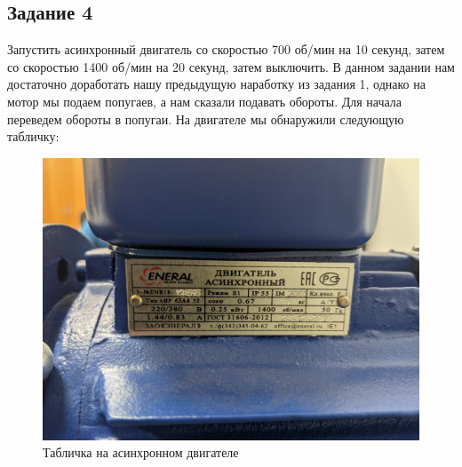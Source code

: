 \documentclass[a4paper, 16pt]{article}
\begin{document}
    \newpage
    \subsection{Задание 4}
    \noindent Запустить асинхронный двигатель со скоростью 700 об/мин на 10 секунд, затем со
    скоростью 1400 об/мин на 20 секунд, затем выключить. В данном задании нам достаточно доработать
    нашу предыдущую наработку из задания 1, однако на мотор мы подаем попугаев, а нам сказали подавать обороты. Для начала
    переведем обороты в попугаи. На двигателе мы обнаружили следующую табличку:
    \begin{figure}[h!]
        \centering
        \includegraphics[scale=0.08]{photo.jpg}
        \captionsetup{skip=0pt}
        \caption{Табличка на асинхронном двигателе}
        \label{Рис:7}
    \end{figure}
\end{document}
